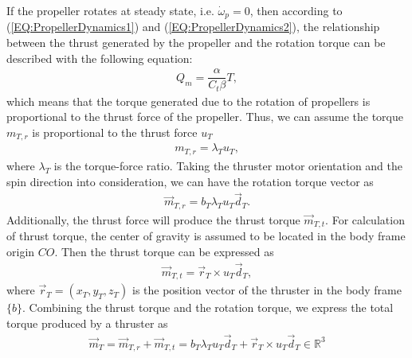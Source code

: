 If the propeller rotates at steady state, i.e. $\dot{\omega}_{p}=0$, then according to (\ref{EQ:PropellerDynamics1}) and (\ref{EQ:PropellerDynamics2}), the relationship between the thrust generated by the propeller and the rotation torque can be described with the following equation:
\begin{align}
Q_{m}=\dfrac{\alpha}{C_{t}\beta}T,
\end{align}
which means that the torque generated due to the rotation of propellers is proportional to the thrust force of the propeller. Thus, we can assume the torque $m_{T,r}$ is proportional to the thrust force $u_{T}$
\begin{align}
m_{T,r}=\lambda_{T} u_{T},
\end{align}   
where $\lambda_{T}$ is the torque-force ratio. Taking the thruster motor orientation and the spin direction into consideration, we can have the rotation torque vector as
\begin{align}
\vec{m}_{T,r}=b_{T}\lambda_{T} u_{T}\vec{d}_{T}.
\end{align} 
Additionally, the thrust force will produce the thrust torque $\vec{m}_{T,t}$. For calculation of thrust torque, the center of gravity is assumed to be located in the body frame origin $CO$. Then the thrust torque can be expressed as
\begin{align}
\vec{m}_{T,t}=\vec{r}_{T}\times u_{T}\vec{d}_{T},
\end{align}
where $\vec{r}_{T}=(x_{T}, y_{T}, z_{T})$ is the position vector of the thruster in the body frame $\lbrace b \rbrace$.
Combining the thrust torque and the rotation torque, we express the total torque produced by a thruster as 
\begin{align}
\vec{m}_{T}=\vec{m}_{T,r}+\vec{m}_{T,t}=b_{T}\lambda_{T} u_{T}\vec{d}_{T}+\vec{r}_{T}\times u_{T}\vec{d}_{T} \in \mathbb{R}^{3}
\end{align}

